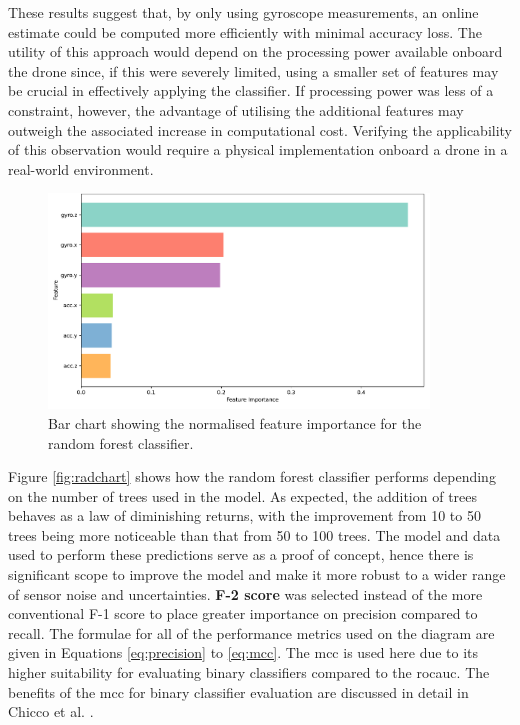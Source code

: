 These results suggest that, by only using gyroscope measurements, an online estimate could be computed more efficiently with minimal accuracy loss. The utility of this approach would depend on the processing power available onboard the drone since, if this were severely limited, using a smaller set of features may be crucial in effectively applying the classifier. If processing power was less of a constraint, however, the advantage of utilising the additional features may outweigh the associated increase in computational cost. Verifying the applicability of this observation would require a physical implementation onboard a drone in a real-world environment.

\begin{figure}[H]
\centering
\includegraphics[width=0.90\textwidth]{figs/Samuel/Figures/feature_importance_smote (cropped) (pdfresizer.com).pdf}
\caption{Bar chart showing the normalised feature importance for the random forest classifier.}
\label{fig:featureimportance}
\end{figure}




Figure \ref{fig:radchart} shows how the random forest classifier performs depending on the number of trees used in the model. As expected, the addition of trees behaves as a law of diminishing returns, with the improvement from 10 to 50 trees being more noticeable than that from 50 to 100 trees. The model and data used to perform these predictions serve as a proof of concept, hence there is significant scope to improve the model and make it more robust to a wider range of sensor noise and uncertainties. \textbf{F-2 score} was selected instead of the more conventional F-1 score to place greater importance on precision compared to recall. The formulae for all of the performance metrics used on the diagram are given in Equations \ref{eq:precision} to \ref{eq:mcc}. The \gls{mcc} is used here due to its higher suitability for evaluating binary classifiers compared to the \gls{rocauc}. The benefits of the \acrshort{mcc} for binary classifier evaluation are discussed in detail in Chicco et al. \cite{Chicco2023}.

